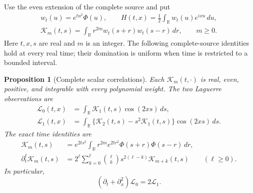 \documentclass[11pt]{article}
\numberwithin{equation}{section}
\newtheorem{proposition}[theorem]{Proposition}
\theoremstyle{definition}
\theoremstyle{remark}
\newcommand{\R}{\mathbb R}
\newcommand{\dd}{\,d}
\newcommand{\Lag}{\mathcal L}
\begin{document}
Use the even extension of the complete source and put
\begin{equation}
\begin{gathered}
 w_t(u)=e^{tu^2}\Phi(u),\qquad
 H(t,x)=\frac12\int_{\R}w_t(u)e^{ixu}\dd u,\\
 \mathscr K_m(t,s)=
 \int_{\R}r^{2m}w_t(s+r)w_t(s-r)\dd r,
 \qquad m\ge0.
\end{gathered}
 \label{eq:corr-definitions}
\end{equation}
Here \(t,x,s\) are real and \(m\) is an integer.  The following
complete-source identities hold at every real time; their domination
is uniform when time is restricted to a bounded interval.

\begin{proposition}[Complete scalar correlations]
\label{prop:complete-correlations}
Each \(\mathscr K_m(t,\cdot)\) is real, even, positive, and integrable
with every polynomial weight.  The two Laguerre observations are
\begin{align}
 \Lag_0(t,x)
 &=\int_{\R}\mathscr K_1(t,s)\cos(2xs)\dd s,
 \label{eq:corr-L0}\\
 \Lag_1(t,x)
 &=\int_{\R}
   \{\mathscr K_2(t,s)-s^2\mathscr K_1(t,s)\}
                     \cos(2xs)\dd s.
 \label{eq:corr-L1}
\end{align}
The exact time identities are
\begin{align}
 \mathscr K_m(t,s)
 &=e^{2ts^2}\int_{\R}r^{2m}e^{2tr^2}
                    \Phi(s+r)\Phi(s-r)\dd r,
 \label{eq:corr-heat-factor}\\
 \partial_t^\ell\mathscr K_m(t,s)
 &=2^\ell\sum_{k=0}^{\ell}\binom{\ell}{k}
                   s^{2(\ell-k)}\mathscr K_{m+k}(t,s)
 \qquad(\ell\ge0).
 \label{eq:corr-heat-hierarchy}
\end{align}
In particular,
\begin{equation}
 (\partial_t+\partial_x^2)\Lag_0=2\Lag_1.
 \label{eq:corr-L-heat}
\end{equation}
\end{proposition}
\end{document}
